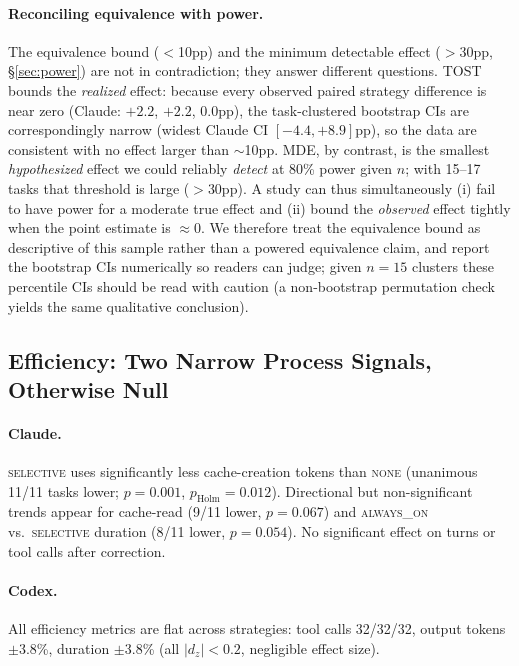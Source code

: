 \documentclass[11pt]{article}
\newcommand{\none}{\textsc{none}}
\newcommand{\alwayson}{\textsc{always\_on}}
\newcommand{\selective}{\textsc{selective}}
\begin{document}
\paragraph{Reconciling equivalence with power.}
The equivalence bound ($<$10pp) and the minimum detectable effect ($>$30pp, \S\ref{sec:power}) are not in contradiction; they answer different questions.
TOST bounds the \emph{realized} effect: because every observed paired strategy difference is near zero (Claude: $+2.2$, $+2.2$, $0.0$pp), the task-clustered bootstrap CIs are correspondingly narrow (widest Claude CI $[-4.4, +8.9]$pp), so the data are consistent with no effect larger than ${\sim}$10pp.
MDE, by contrast, is the smallest \emph{hypothesized} effect we could reliably \emph{detect} at 80\% power given $n$; with 15--17 tasks that threshold is large ($>$30pp).
A study can thus simultaneously (i) fail to have power for a moderate true effect and (ii) bound the \emph{observed} effect tightly when the point estimate is ${\approx}0$.
We therefore treat the equivalence bound as descriptive of this sample rather than a powered equivalence claim, and report the bootstrap CIs numerically so readers can judge; given $n{=}15$ clusters these percentile CIs should be read with caution (a non-bootstrap permutation check yields the same qualitative conclusion).

\subsection{Efficiency: Two Narrow Process Signals, Otherwise Null}

\paragraph{Claude.}
\selective{} uses significantly less cache-creation tokens than \none{} (unanimous 11/11 tasks lower; $p{=}0.001$, $p_{\text{Holm}}{=}0.012$).
Directional but non-significant trends appear for cache-read (9/11 lower, $p{=}0.067$) and \alwayson{} vs.\ \selective{} duration (8/11 lower, $p{=}0.054$).
No significant effect on turns or tool calls after correction.

\paragraph{Codex.}
All efficiency metrics are flat across strategies: tool calls 32/32/32, output tokens $\pm$3.8\%, duration $\pm$3.8\% (all $|d_z|{<}0.2$, negligible effect size).
\end{document}
